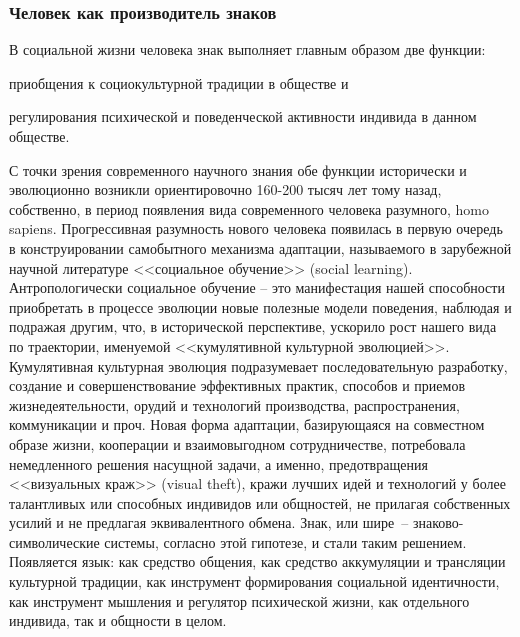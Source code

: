 \subsubsection{Человек как производитель знаков}
\label{2.1}
В социальной жизни человека знак выполняет главным образом две
функции:
\begin{enumerate*}[label=\asbuk*)]
    \item приобщения к социокультурной традиции в обществе и
    \item регулирования психической и поведенческой активности индивида в
данном обществе.
\end{enumerate*}
С точки зрения современного научного знания обе
функции исторически и эволюционно возникли ориентировочно 160-200
тысяч лет тому назад, собственно, в период появления вида современного
человека разумного, homo sapiens\autocite{pagel2012wired}. Прогрессивная
разумность нового человека появилась в первую очередь в
конструировании самобытного механизма адаптации, называемого в
зарубежной научной литературе <<социальное обучение>>
(social learning)\autocite{ormrod1999human}\autocite{miller2010theories}\autocite{online:sociallearning}.
Антропологически социальное обучение -- это манифестация
нашей способности приобретать в процессе эволюции новые полезные
модели поведения, наблюдая и подражая другим, что, в исторической
перспективе, ускорило рост нашего вида по траектории, именуемой
<<кумулятивной культурной эволюцией>>. Кумулятивная культурная
эволюция подразумевает последовательную разработку, создание и
совершенствование эффективных практик, способов и приемов
жизнедеятельности, орудий и технологий производства, распространения,
коммуникации и проч. Новая форма адаптации, базирующаяся на
совместном образе жизни, кооперации и взаимовыгодном сотрудничестве,
потребовала немедленного решения насущной задачи, а именно,
предотвращения <<визуальных краж>> (visual theft), кражи лучших идей и
технологий у более талантливых или способных индивидов или общностей,
не прилагая собственных усилий и не предлагая эквивалентного обмена\autocite{pagel2012wired}.
Знак, или шире~-- знаково-символические системы, согласно этой
гипотезе, и стали таким решением. Появляется язык: как средство общения,
как средство аккумуляции и трансляции культурной традиции, как
инструмент формирования социальной идентичности, как инструмент
мышления и регулятор психической жизни, как отдельного индивида, так и
общности в целом.

